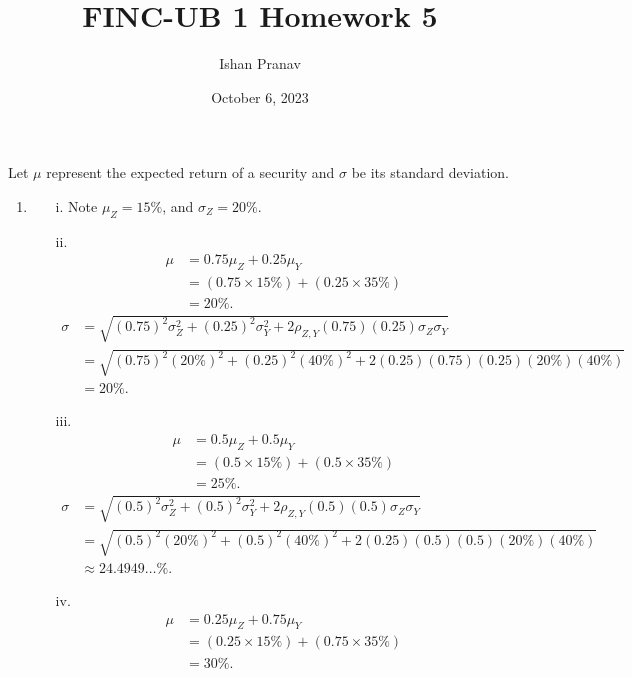 \documentclass[12pt]{article}
\title{FINC-UB 1 Homework 5}
\author{Ishan Pranav}
\date{October 6, 2023}
\begin{document}
\maketitle
\section{}
Let $\mu$ represent the expected return of a security and $\sigma$ be its standard deviation.
\begin{enumerate}
    \item
    \begin{enumerate}
        \item[i.] Note $\mu_Z=15\%$, and $\sigma_Z=20\%$.
        \item[ii.]
        \begin{align*}
        \mu
        &=0.75\mu_Z+0.25\mu_Y\\
        &=(0.75\times 15\%)+(0.25\times 35\%)\\
        &=20\%.
        \end{align*}
        \begin{align*}
        \sigma
        &=\sqrt{(0.75)^2\sigma_Z^2+(0.25)^2\sigma_Y^2+2\rho_{Z,Y}(0.75)(0.25)\sigma_Z\sigma_Y}\\
        &=\sqrt{(0.75)^2(20\%)^2+(0.25)^2(40\%)^2+2(0.25)(0.75)(0.25)(20\%)(40\%)}\\
        &=20\%.
        \end{align*}
        \item[iii.]
        \begin{align*}
        \mu
        &=0.5\mu_Z+0.5\mu_Y\\
        &=(0.5\times 15\%)+(0.5\times 35\%)\\
        &=25\%.
        \end{align*}
        \begin{align*}
        \sigma
        &=\sqrt{(0.5)^2\sigma_Z^2+(0.5)^2\sigma_Y^2+2\rho_{Z,Y}(0.5)(0.5)\sigma_Z\sigma_Y}\\
        &=\sqrt{(0.5)^2(20\%)^2+(0.5)^2(40\%)^2+2(0.25)(0.5)(0.5)(20\%)(40\%)}\\
        &\approx 24.4949\dots\%.
        \end{align*}
        \item[iv.]
        \begin{align*}
        \mu
        &=0.25\mu_Z+0.75\mu_Y\\
        &=(0.25\times 15\%)+(0.75\times 35\%)\\
        &=30\%.
        \end{align*}

\end{enumerate}
\end{enumerate}
\end{document}
